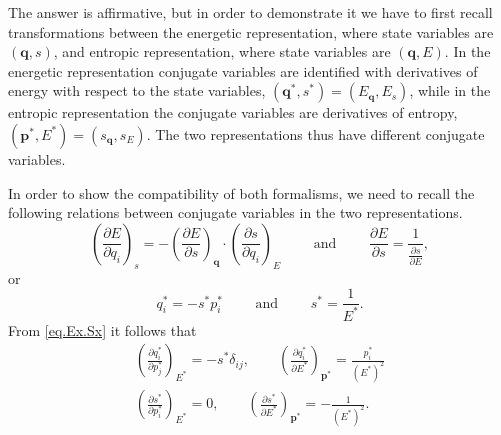 \documentclass[twoside]{article}
\newcommand{\qq}{{\boldsymbol{q}}}
\newcommand{\pp}{{\boldsymbol{p}}}
\newcommand{\ted}{E} %
\newcommand{\pd}{\partial}
\begin{document}
The answer is affirmative, but in order to 
demonstrate it we have to first recall transformations between the energetic 
representation, where state variables are $(\qq,s)$, and entropic 
representation, where state variables are $(\qq,\ted)$.
In the energetic representation conjugate variables are identified with 
derivatives of energy with respect to the state variables, $(\qq^*,s^*) = 
(E_\qq, E_s)$, while in the entropic representation the conjugate 
variables are derivatives of entropy, $(\pp^*, \ted^*) = (s_\qq, s_\ted)$. The 
two representations thus have different conjugate variables.

In order to show the  compatibility of both formalisms, we need to recall the 
following relations between conjugate variables in the two representations. 
\begin{equation}\label{eq.Ex.Sx}
\left(\frac{\pd E}{\pd q_i}\right)_s = - \left(\frac{\pd 
E}{\pd s}\right)_{\qq} \cdot\left(\frac{\pd s}{\pd q_i}\right)_\ted
\qquad \text{ and } \qquad \frac{\pd E}{\pd s} = \frac{1}{\frac{\pd 
s}{\pd \ted}},
\end{equation}
or 
\begin{equation}\label{eq.Ex.Sx.2}
q^*_i = - s^* p^*_i
\qquad \text{ and } \qquad s^* = \frac{1}{\ted^*}.
\end{equation}
From \eqref{eq.Ex.Sx} it follows that
\begin{subequations}
\begin{eqnarray}
\left(\frac{\pd q^*_i}{\pd p^*_j}\right)_{\ted^*} = -s^* \delta_{ij}, 
\qquad
\left(\frac{\pd q^*_i}{\pd \ted^*}\right)_{\pp^*}= 
\frac{p^*_i}{(\ted^*)^2}\\[2mm]
\left(\frac{\pd s^*}{\pd p^*_i}\right)_{\ted^*} = 0, 
\qquad
\left(\frac{\pd s^*}{\pd \ted^*}\right)_{\pp^*}
=-\frac{1}{(\ted^*)^2}.
\end{eqnarray}
\end{subequations}
\end{document}
